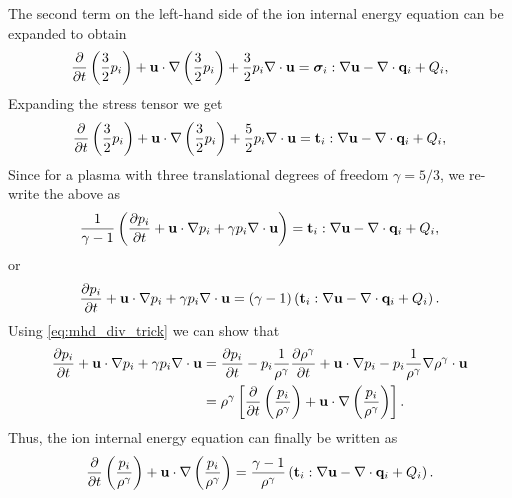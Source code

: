 \documentclass[a4paper,11pt]{report}
\begin{document}
The second term on the left-hand side of the ion internal energy equation can be expanded to obtain
\begin{equation*}
    \frac{\partial}{\partial t} \left( \frac{3}{2} p_i \right) + \mathbf{u} \cdot \nabla \left( \frac{3}{2} p_i \right) + \frac{3}{2}p_i \nabla \cdot \mathbf{u} = \bm \sigma_i : \nabla \mathbf{u} - \nabla \cdot \mathbf{q}_i + Q_i,
\end{equation*}
Expanding the stress tensor we get
\begin{equation*}
    \frac{\partial}{\partial t} \left( \frac{3}{2} p_i \right) + \mathbf{u} \cdot \nabla \left( \frac{3}{2} p_i \right) + \frac{5}{2} p_i \nabla \cdot \mathbf{u} = \mathbf{t}_i : \nabla \mathbf{u} - \nabla \cdot \mathbf{q}_i + Q_i,
\end{equation*}
Since for a plasma with three translational degrees of freedom $\gamma = 5/3$, we re-write the above as
\begin{equation*}
    \frac{1}{\gamma - 1} \left( \frac{\partial p_i}{\partial t} + \mathbf{u} \cdot \nabla p_i + \gamma p_i \nabla \cdot \mathbf{u} \right) = \mathbf{t}_i : \nabla \mathbf{u} - \nabla \cdot \mathbf{q}_i + Q_i,
\end{equation*}
or
\begin{equation*}
    \frac{\partial p_i}{\partial t} + \mathbf{u} \cdot \nabla p_i + \gamma p_i \nabla \cdot \mathbf{u} = (\gamma - 1) \left( \mathbf{t}_i : \nabla \mathbf{u} - \nabla \cdot \mathbf{q}_i + Q_i \right). 
\end{equation*}
Using \cref{eq:mhd_div_trick} we can show that
\begin{align*}
    \frac{\partial p_i}{\partial t} + \mathbf{u} \cdot \nabla p_i + \gamma p_i \nabla \cdot \mathbf{u} 
    &=  \frac{\partial p_i}{\partial t} - p_i \frac{1}{\rho^\gamma} \frac{\partial \rho^\gamma}{\partial t} + \mathbf{u} \cdot \nabla p_i - p_i \frac{1}{\rho^\gamma} \nabla \rho^\gamma \cdot \mathbf{u} \nonumber \\
    & = \rho^\gamma \left [ \frac{\partial}{\partial t} \left( \frac{p_i}{\rho^\gamma} \right) + \mathbf{u} \cdot \nabla \left(\frac{p_i}{\rho^\gamma} \right) \right ].
\end{align*}
Thus, the ion internal energy equation can finally be written as
\begin{equation*}
    \frac{\partial}{\partial t} \left( \frac{p_i}{\rho^\gamma} \right) + \mathbf{u} \cdot \nabla \left(\frac{p_i}{\rho^\gamma} \right) = \frac{\gamma - 1}{\rho^\gamma} \left( \mathbf{t}_i : \nabla \mathbf{u} - \nabla \cdot \mathbf{q}_i + Q_i \right).
\end{equation*}

\end{document}
